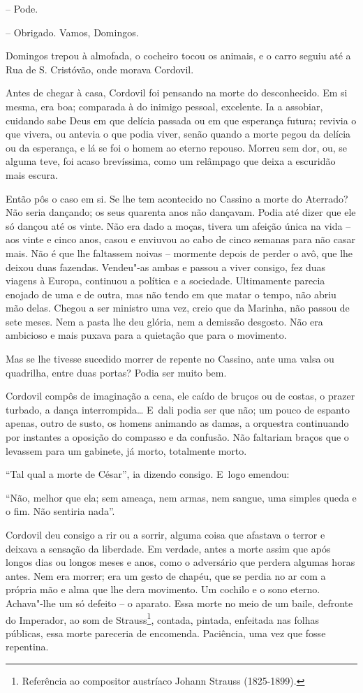 -- Pode.

-- Obrigado. Vamos, Domingos.

Domingos trepou à almofada, o cocheiro tocou os animais, e o carro
seguiu até a Rua de S. Cristóvão, onde morava Cordovil.

Antes de chegar à casa, Cordovil foi pensando na morte do desconhecido.
Em si mesma, era boa; comparada à do inimigo pessoal, excelente. Ia a
assobiar, cuidando sabe Deus em que delícia passada ou em que esperança
futura; revivia o que vivera, ou antevia o que podia viver, senão quando
a morte pegou da delícia ou da esperança, e lá se foi o homem ao eterno
repouso. Morreu sem dor, ou, se alguma teve, foi acaso brevíssima, como
um relâmpago que deixa a escuridão mais escura.

Então pôs o caso em si. Se lhe tem acontecido no Cassino a morte do
Aterrado? Não seria dançando; os seus quarenta anos não dançavam. Podia
até dizer que ele só dançou até os vinte. Não era dado a moças, tivera
um afeição única na vida -- aos vinte e cinco anos, casou e enviuvou ao
cabo de cinco semanas para não casar mais. Não é que lhe faltassem
noivas -- mormente depois de perder o avô, que lhe deixou duas fazendas.
Vendeu"-as ambas e passou a viver consigo, fez duas viagens à Europa,
continuou a política e a sociedade. Ultimamente parecia enojado de uma e
de outra, mas não tendo em que matar o tempo, não abriu mão delas.
Chegou a ser ministro uma vez, creio que da Marinha, não passou de sete
meses. Nem a pasta lhe deu glória, nem a demissão desgosto. Não era
ambicioso e mais puxava para a quietação que para o movimento.

Mas se lhe tivesse sucedido morrer de repente no Cassino, ante uma valsa
ou quadrilha, entre duas portas? Podia ser muito bem.

Cordovil compôs de imaginação a cena, ele caído de bruços ou de costas,
o prazer turbado, a dança interrompida\ldots{} E~dali podia ser que não; um
pouco de espanto apenas, outro de susto, os homens animando as damas, a
orquestra continuando por instantes a oposição do compasso e da
confusão. Não faltariam braços que o levassem para um gabinete, já
morto, totalmente morto.

``Tal qual a morte de César'', ia dizendo consigo. E~logo emendou:

``Não, melhor que ela; sem ameaça, nem armas, nem sangue, uma simples
queda e o fim. Não sentiria nada''.

Cordovil deu consigo a rir ou a sorrir, alguma coisa que afastava o
terror e deixava a sensação da liberdade. Em verdade, antes a morte
assim que após longos dias ou longos meses e anos, como o adversário que
perdera algumas horas antes. Nem era morrer; era um gesto de chapéu, que
se perdia no ar com a própria mão e alma que lhe dera movimento. Um
cochilo e o sono eterno. Achava"-lhe um só defeito -- o aparato. Essa
morte no meio de um baile, defronte do Imperador, ao som de
Strauss\footnote{Referência ao compositor austríaco Johann Strauss
  (1825-1899).}, contada, pintada, enfeitada nas folhas públicas, essa
morte pareceria de encomenda. Paciência, uma vez que fosse repentina.

